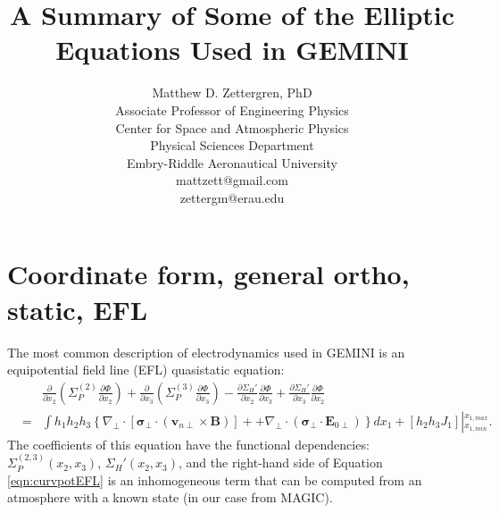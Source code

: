 \documentclass[11pt,letterpaper]{article}
\begin{document}
\setlength{\parindent}{0mm}
\setlength{\parskip}{0.4cm}




\title{A Summary of Some of the Elliptic Equations Used in GEMINI}
\author{Matthew D. Zettergren, PhD\\ Associate Professor of Engineering Physics\\ Center for Space and Atmospheric Physics\\ Physical Sciences Department \\Embry-Riddle Aeronautical University\\mattzett@gmail.com\\zettergm@erau.edu}
\maketitle

\tableofcontents

\pagebreak


\section{Coordinate form, general ortho, static, EFL} \label{sec:main}

The most common description of electrodynamics used in GEMINI is an equipotential field line (EFL) quasistatic equation:  
\begin{eqnarray}
&~& \frac{\partial}{\partial x_2} \left( \Sigma_P^{(2)} \frac{\partial \Phi}{\partial x_2} \right) + \frac{\partial}{\partial x_3} \left( \Sigma_P^{(3)} \frac{\partial \Phi}{\partial x_3} \right) -  \frac{\partial \Sigma_H'}{\partial x_2} \frac{\partial \Phi}{\partial x_3} + \frac{\partial \Sigma_H'}{\partial x_3} \frac{\partial \Phi}{\partial x_2} \nonumber \\ &=& \int h_1 h_2 h_3 \left\{ \nabla_\perp \cdot \left[ \boldsymbol{\sigma}_\perp \cdot \left( \mathbf{v}_{n\perp} \times \mathbf{B} \right) \right] + + \nabla_\perp \cdot \left( \boldsymbol{\sigma}_\perp \cdot \mathbf{E}_{0\perp} \right) \right\} d x_1 + \left[ h_2 h_3 J_1 \right] \left|^{x_{1,max}}_{x_{1,min}} \right. . \label{eqn:curvpotEFL}
\end{eqnarray}
The coefficients of this equation have the functional dependencies:  $\Sigma_P^{(2,3)}(x_2,x_3)$, $\Sigma_H'(x_2,x_3)$, and the right-hand side of Equation \ref{eqn:curvpotEFL} is an inhomogeneous term that can be computed from an atmosphere with a known state (in our case from MAGIC).  
\end{document}
